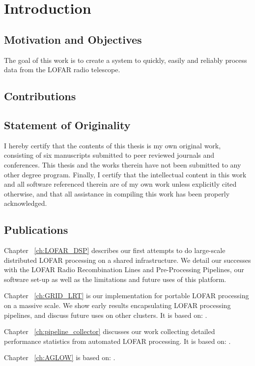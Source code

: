 \chapter{Introduction}

\section{Motivation and Objectives}

The goal of this work is to create a system to quickly, easily and reliably process data from the LOFAR radio telescope. 




\section{Contributions}




\section{Statement of Originality}

I hereby certify that the contents of this thesis is my own original work, consisting of six manuscripts submitted to peer reviewed journals and conferences. This thesis and the works therein have not been submitted to any other degree program. Finally, I certify that the intellectual content in this work and all software referenced therein are of my own work unless explicitly cited otherwise, and that all assistance in compiling this work has been properly acknowledged.

\section{Publications}

Chapter ~\ref{ch:LOFAR_DSP} describes our first attempts to do large-scale distributed LOFAR processing on a shared infrastructure. We detail our successes with the LOFAR Radio Recombination Lines and Pre-Processing Pipelines, our software set-up as well as the limitations and future uses of this platform.  


Chapter ~\ref{ch:GRID_LRT} is our implementation for portable LOFAR processing on a massive scale. We show early results encapsulating LOFAR processing pipelines, and discuss future uses on other clusters. It is based on:  .

Chapter ~\ref{ch:pipeline_collector} discusses our work collecting detailed performance statistics from automated LOFAR processing. It is based on: .

Chapter ~\ref{ch:AGLOW} is based on: .

